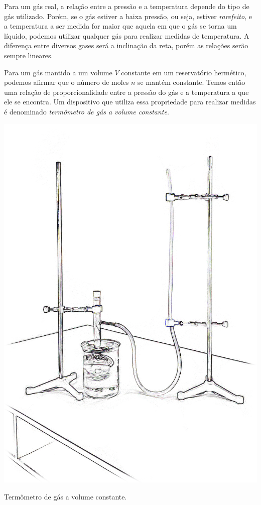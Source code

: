 Para um gás real, a relação entre a pressão e a temperatura depende do tipo de gás utilizado. Porém, se o gás estiver a baixa pressão, ou seja, estiver \emph{rarefeito}, e a temperatura a ser medida for maior que aquela em que o gás se torna um líquido, podemos utilizar qualquer gás para realizar medidas de temperatura. A diferença entre diversos gases será a inclinação da reta, porém as relações serão sempre lineares.

Para um gás mantido a um volume $V$ constante em um reservatório hermético, podemos afirmar que o número de moles $n$ se mantém constante. Temos então uma relação de proporcionalidade entre a pressão do gás e a temperatura a que ele se encontra. Um dispositivo que utiliza essa propriedade para realizar medidas é denominado \emph{termômetro de gás a volume constante}.

\begin{marginfigure}
\centering
\includegraphics[width=\textwidth]{Ilustrations/Term_gas.png}
\caption{Termômetro de gás a volume constante.\label{Fig:TermometroGas}}
\end{marginfigure}

